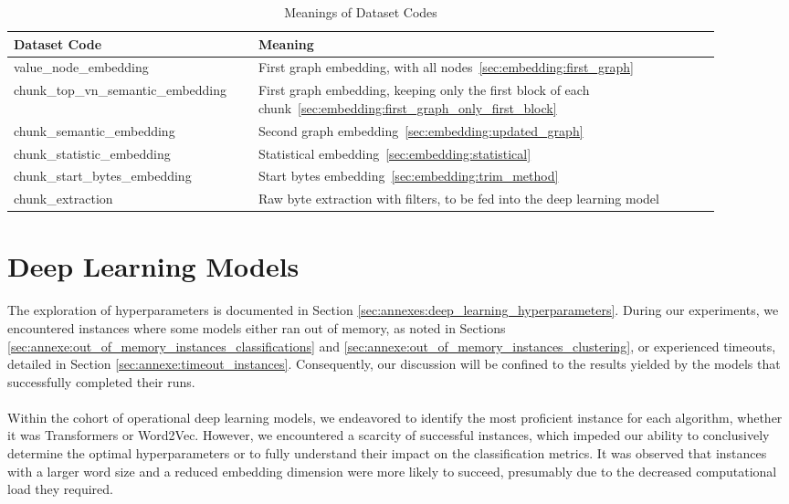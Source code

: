 \begin{table}[ht]
    \centering
    \begin{tabular}{|p{0.3\linewidth}|p{0.6\linewidth}|}
    \hline
    Dataset Code & Meaning \\ 
    \hline
    value\_node\_embedding & First graph embedding, with all nodes~\ref{sec:embedding:first_graph} \\ \hline
    chunk\_top\_vn\_semantic\_embedding & First graph embedding, keeping only the first block of each chunk~\ref{sec:embedding:first_graph_only_first_block} \\ \hline
    chunk\_semantic\_embedding & Second graph embedding~\ref{sec:embedding:updated_graph} \\ \hline
    chunk\_statistic\_embedding & Statistical embedding~\ref{sec:embedding:statistical} \\ \hline
    chunk\_start\_bytes\_embedding & Start bytes embedding~\ref{sec:embedding:trim_method} \\ \hline
    chunk\_extraction & Raw byte extraction with filters, to be fed into the deep learning model\\ \hline
    \end{tabular}
    \caption{Meanings of Dataset Codes}
    \label{tab:results:dataset_codes}
\end{table}


\section{Deep Learning Models}

\paragraph{}The exploration of hyperparameters is documented in Section \ref{sec:annexes:deep_learning_hyperparameters}. During our experiments, we encountered instances where some models either ran out of memory, as noted in Sections \ref{sec:annexe:out_of_memory_instances_classifications} and \ref{sec:annexe:out_of_memory_instances_clustering}, or experienced timeouts, detailed in Section \ref{sec:annexe:timeout_instances}. Consequently, our discussion will be confined to the results yielded by the models that successfully completed their runs.

\paragraph{}Within the cohort of operational deep learning models, we endeavored to identify the most proficient instance for each algorithm, whether it was Transformers or Word2Vec. However, we encountered a scarcity of successful instances, which impeded our ability to conclusively determine the optimal hyperparameters or to fully understand their impact on the classification metrics. It was observed that instances with a larger word size and a reduced embedding dimension were more likely to succeed, presumably due to the decreased computational load they required.

